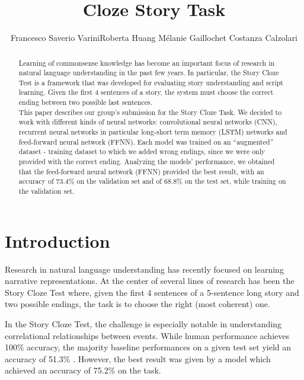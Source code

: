 \documentclass{article}
\title{Cloze Story Task}
\author{Francesco Saverio Varini\qquad Roberta Huang \qquad Mélanie Gaillochet \qquad Costanza Calzolari}
\begin{document}

\maketitle

\begin{abstract}
Learning of commonsense knowledge has become an important focus of research in natural language understanding in the past few years. In particular, the Story Cloze Test is a framework that was developed for evaluating story understanding and script learning. Given the first 4 sentences of a story, the system must choose the correct ending between two possible last sentences. \\
This paper describes our group’s submission for the Story Cloze Task. We decided to work with different kinds of neural networks: convolutional neural networks (CNN), recurrent neural networks in particular long-short term memory (LSTM) networks and feed-forward neural network (FFNN). Each model was trained on an ``augmented'' dataset - training dataset to which we added wrong endings, since we were only provided with the correct ending. Analyzing the models' performance, we obtained that the feed-forward neural network (FFNN) provided the best result, with an accuracy of 73.4\% on the validation set and of 68.8\% on the test set, while training on the validation set.



\end{abstract}

\section{Introduction}
Research in natural language understanding has recently focused on learning narrative representations. At the center of several lines of research has been the Story Cloze Test where, given the first 4 sentences of a 5-sentence long story and two possible endings, the task is to choose the right (most coherent) one.

In the Story Cloze Test, the challenge is especially notable in understanding correlational relationships between events. While human performance achieves 100\% accuracy, the majority baseline performances on a given test set yield an accuracy of 51.3\% \cite{LSDSem2017}. However, the best result was given by a model which achieved an accuracy of 75.2\% on the task.
\end{document}

